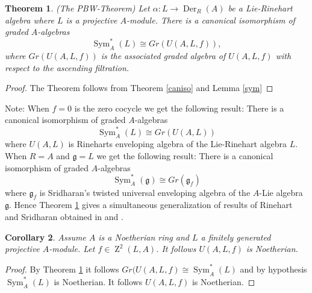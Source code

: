\documentclass{amsart}
\theoremstyle{plain}
\newtheorem{theorem}{Theorem}[section]
\newtheorem{corollary}[theorem]{Corollary}
\theoremstyle{definition}
\theoremstyle{remark}
\numberwithin{equation}{theorem}
\begin{document}
\begin{theorem}\label{pbw}(The PBW-Theorem) Let $\alpha:L\rightarrow {\operatorname{Der} }_R(A)$ be a Lie-Rinehart algebra 
where $L$ is a projective ${A}$-module. There is a canonical isomorphism of graded ${A}$-algebras
\[ {\operatorname{Sym} }^*_{A}(L)\cong Gr(U({A},L,f)), \]
where $Gr(U({A},L,f))$ is the associated graded algebra of $U({A},L,f)$ with respect to the ascending filtration.
\end{theorem}
\begin{proof} The Theorem follows from Theorem \ref{caniso} and Lemma \ref{sym}
\end{proof}

Note: When $f=0$ is the zero cocycle we get the following result: There is a canonical isomorphism
of graded ${A}$-algebras
\[ {\operatorname{Sym} }^*_{A}(L)\cong Gr(U({A},L))\]
where $U({A},L)$ is Rineharts enveloping algebra of the Lie-Rinehart algebra $L$.
When ${R}={A}$ and ${\mathfrak{g}}=L$ we get the following result:
There is a canonical isomorphism of graded ${A}$-algebras
\[ {\operatorname{Sym} }^*_{A}({\mathfrak{g}})\cong Gr({\mathfrak{g}}_f) \]
where ${\mathfrak{g}}_f$ is Sridharan's twisted universal enveloping algebra of the ${A}$-Lie algebra ${\mathfrak{g}}$.
Hence Theorem \ref{pbw} gives a simultaneous generalization of results of 
Rinehart and Sridharan obtained in \cite{rinehart} and \cite{sridharan}.

\begin{corollary} Assume ${A}$ is a Noetherian ring and $L$ a finitely generated projective ${A}$-module.
Let $f\in {\operatorname{Z}}^2(L,{A})$. It follows $U({A},L,f)$ is Noetherian.
\end{corollary}
\begin{proof} By Theorem \ref{pbw} it follows $Gr(U({A},L,f)\cong {\operatorname{Sym} }^*_{A}(L)$ and by hypothesis
${\operatorname{Sym} }^*_{A}(L)$ is Noetherian. It follows $U({A},L,f)$ is Noetherian.
\end{proof}
\end{document}
